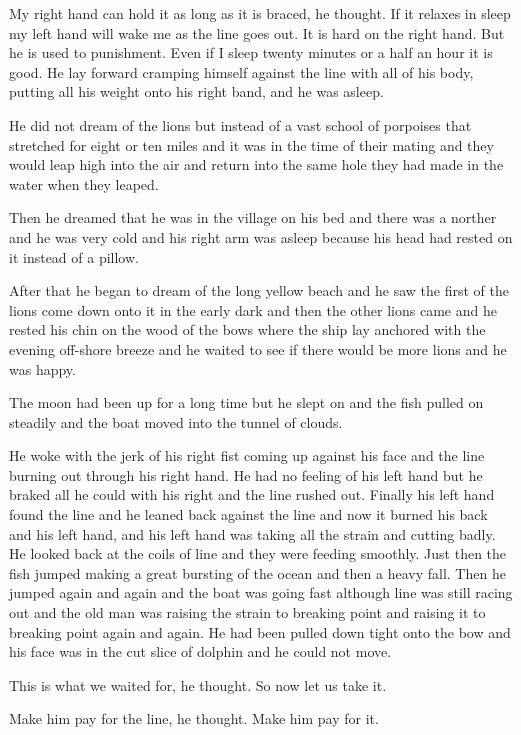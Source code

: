\documentclass[fontset=ubuntu]{ctexrep}
\begin{document}
My right hand can hold it as long as it is braced, he thought. If it relaxes
in sleep my left hand will wake me as the line goes out. It is hard on the
right hand. But he is used to punishment. Even if I sleep twenty minutes or
a half an hour it is good. He lay forward cramping himself against the line
with all of his body, putting all his weight onto his right band, and he was
asleep.

He did not dream of the lions but instead of a \gls{vast} school of
porpoises that \gls{stretched} for eight or ten miles and it was in the time of
their \gls{mating} and they would leap high into the air and return into the same
hole they had made in the water when they leaped.

Then he dreamed that he was in the village on his bed and there was a
\gls{norther} and he was very cold and his right arm was asleep because his
head had rested on it instead of a pillow.

After that he began to dream of the long yellow beach and he saw the first
of the lions come down onto it in the early dark and then the other lions
came and he rested his chin on the wood of the bows where the ship lay
anchored with the evening off-shore breeze and he waited to see if there
would be more lions and he was happy.

The moon had been up for a long time but he slept on and the fish pulled on
steadily and the boat moved into the \gls{tunnel} of clouds.

He woke with the jerk of his right \gls{fist} coming up against his face and
the line burning out through his right hand. He had no feeling of his left
hand but he \gls{braked} all he could with his right and the line rushed
out. Finally his left hand found the line and he leaned back against the
line and now it burned his back and his left hand, and his left hand was
taking all the strain and cutting badly. He looked back at the coils of line
and they were feeding smoothly. Just then the fish jumped making a great
\gls{bursting} of the ocean and then a heavy fall. Then he jumped again and
again and the boat was going fast although line was still racing out and the
old man was raising the strain to breaking point and raising it to breaking
point again and again. He had been pulled down tight onto the bow and his
face was in the cut slice of dolphin and he could not move.

This is what we waited for, he thought. So now let us take it.

Make him pay for the line, he thought. Make him pay for it.
\end{document}
